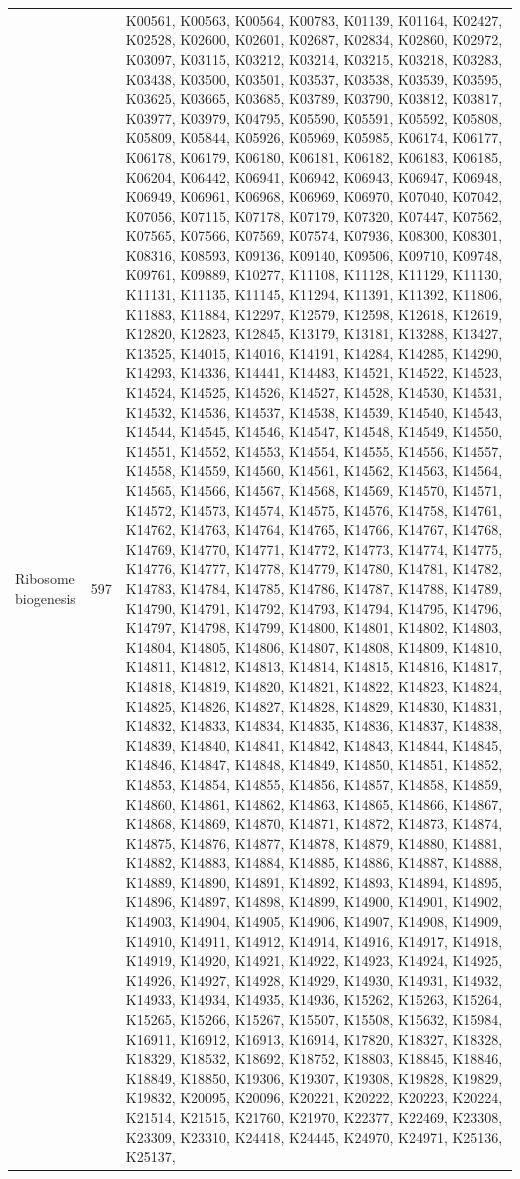 \begin{longtable}{@{}p{3.2cm} r p{9.5cm}@{}}
Ribosome biogenesis & 597 & K00561, K00563, K00564, K00783, K01139, K01164, K02427, K02528, K02600, K02601, K02687, K02834, K02860, K02972, K03097, K03115, K03212, K03214, K03215, K03218, K03283, K03438, K03500, K03501, K03537, K03538, K03539, K03595, K03625, K03665, K03685, K03789, K03790, K03812, K03817, K03977, K03979, K04795, K05590, K05591, K05592, K05808, K05809, K05844, K05926, K05969, K05985, K06174, K06177, K06178, K06179, K06180, K06181, K06182, K06183, K06185, K06204, K06442, K06941, K06942, K06943, K06947, K06948, K06949, K06961, K06968, K06969, K06970, K07040, K07042, K07056, K07115, K07178, K07179, K07320, K07447, K07562, K07565, K07566, K07569, K07574, K07936, K08300, K08301, K08316, K08593, K09136, K09140, K09506, K09710, K09748, K09761, K09889, K10277, K11108, K11128, K11129, K11130, K11131, K11135, K11145, K11294, K11391, K11392, K11806, K11883, K11884, K12297, K12579, K12598, K12618, K12619, K12820, K12823, K12845, K13179, K13181, K13288, K13427, K13525, K14015, K14016, K14191, K14284, K14285, K14290, K14293, K14336, K14441, K14483, K14521, K14522, K14523, K14524, K14525, K14526, K14527, K14528, K14530, K14531, K14532, K14536, K14537, K14538, K14539, K14540, K14543, K14544, K14545, K14546, K14547, K14548, K14549, K14550, K14551, K14552, K14553, K14554, K14555, K14556, K14557, K14558, K14559, K14560, K14561, K14562, K14563, K14564, K14565, K14566, K14567, K14568, K14569, K14570, K14571, K14572, K14573, K14574, K14575, K14576, K14758, K14761, K14762, K14763, K14764, K14765, K14766, K14767, K14768, K14769, K14770, K14771, K14772, K14773, K14774, K14775, K14776, K14777, K14778, K14779, K14780, K14781, K14782, K14783, K14784, K14785, K14786, K14787, K14788, K14789, K14790, K14791, K14792, K14793, K14794, K14795, K14796, K14797, K14798, K14799, K14800, K14801, K14802, K14803, K14804, K14805, K14806, K14807, K14808, K14809, K14810, K14811, K14812, K14813, K14814, K14815, K14816, K14817, K14818, K14819, K14820, K14821, K14822, K14823, K14824, K14825, K14826, K14827, K14828, K14829, K14830, K14831, K14832, K14833, K14834, K14835, K14836, K14837, K14838, K14839, K14840, K14841, K14842, K14843, K14844, K14845, K14846, K14847, K14848, K14849, K14850, K14851, K14852, K14853, K14854, K14855, K14856, K14857, K14858, K14859, K14860, K14861, K14862, K14863, K14865, K14866, K14867, K14868, K14869, K14870, K14871, K14872, K14873, K14874, K14875, K14876, K14877, K14878, K14879, K14880, K14881, K14882, K14883, K14884, K14885, K14886, K14887, K14888, K14889, K14890, K14891, K14892, K14893, K14894, K14895, K14896, K14897, K14898, K14899, K14900, K14901, K14902, K14903, K14904, K14905, K14906, K14907, K14908, K14909, K14910, K14911, K14912, K14914, K14916, K14917, K14918, K14919, K14920, K14921, K14922, K14923, K14924, K14925, K14926, K14927, K14928, K14929, K14930, K14931, K14932, K14933, K14934, K14935, K14936, K15262, K15263, K15264, K15265, K15266, K15267, K15507, K15508, K15632, K15984, K16911, K16912, K16913, K16914, K17820, K18327, K18328, K18329, K18532, K18692, K18752, K18803, K18845, K18846, K18849, K18850, K19306, K19307, K19308, K19828, K19829, K19832, K20095, K20096, K20221, K20222, K20223, K20224, K21514, K21515, K21760, K21970, K22377, K22469, K23308, K23309, K23310, K24418, K24445, K24970, K24971, K25136, K25137, 
\end{longtable}
